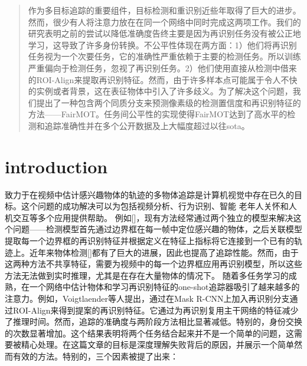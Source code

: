 \documentclass{ctexart}
\begin{document}
\title{}
\begin{abstract}
    作为多目标追踪的重要组件，目标检测和重识别近些年取得了巨大的进步。然而，很少有人将注意力放在在同一个网络中同时完成这两项工作。我们的研究表明之前的尝试以降低准确度告终主要是因为再识别任务没有被公正地学习，这导致了许多身份转换。不公平性体现在两方面：1）他们将再识别任务视为一个次要任务，它的准确性严重依赖于主要的检测任务。所以训练严重偏向于检测任务，忽视了再识别任务。2）他们使用直接从检测中借来的ROI-Align来提取再识别特征。然而，由于许多样本点可能属于令人不快的实例或者背景，这在表征物体中引入了许多歧义。为了解决这个问题，我们提出了一种包含两个同质分支来预测像素级的检测置信度和再识别特征的方法——FairMOT。任务间公平性的实现使得FairMOT达到了高水平的检测和追踪准确性并在多个公开数据及上大幅度超过以往sota。
\end{abstract}
\section{introduction}
致力于在视频中估计感兴趣物体的轨迹的多物体追踪是计算机视觉中存在已久的目标。这个问题的成功解决可以为包括视频分析、行为识别、智能 老年人关怀和人机交互等多个应用提供帮助。\newline
例如[]，现有方法经常通过两个独立的模型来解决这个问题——检测模型首先通过边界框在每一帧中定位感兴趣的物体，之后关联模型提取每一个边界框的再识别特征并根据定义在特征上指标将它连接到一个已有的轨迹上。近年来物体检测[]都有了巨大的进展，因此也提高了追踪性能。然而，由于这两种方法不共享特征，需要为视频中的每一个边界框应用再识别模型，所以这些方法无法做到实时推理，尤其是在存在大量物体的情况下。\newline
随着多任务学习的成熟，在一个网络中估计物体和学习再识别特征的one-shot追踪器吸引了越来越多的注意力。例如，Voigtlaender等人提出，通过在Mask R-CNN上加入再识别分支通过ROI-Align来得到提案的再识别特征。它通过为再识别复用主干网络的特征减少了推理时间。然而，追踪的准确度与两阶段方法相比显著减低。特别的，身份交换的次数显著增加。这个结果表明将两个任务结合起来并不是一个简单的问题，这需要被精心处理。在这篇文章的目标是深度理解失败背后的原因，并展示一个简单然而有效的方法。特别的，三个因素被提了出来：
\end{document}
